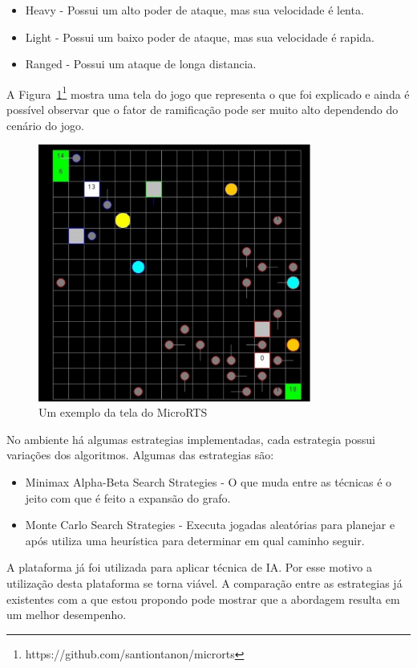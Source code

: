 \begin{itemize}
	\item Heavy - Possui um alto poder de ataque, mas sua velocidade é lenta.
	\item Light - Possui um baixo poder de ataque, mas sua velocidade é rapida.
	\item Ranged - Possui um ataque de longa distancia. 
\end{itemize} 

A Figura~\ref{fig:microrts}\footnote{https://github.com/santiontanon/microrts} mostra uma tela do jogo que representa o que foi explicado e ainda é possível observar que o fator de ramificação pode ser muito alto dependendo do cenário do jogo. %

\begin{figure}[ht]
	\centering
	\includegraphics[width=0.8\textwidth]{fig/microrts.pdf}
	\caption{Um exemplo da tela do MicroRTS}
	\label{fig:microrts}
\end{figure} 

No ambiente há algumas estrategias implementadas, cada estrategia possui variações dos algoritmos. Algumas das estrategias são:
\begin{itemize}
	\item Minimax Alpha-Beta Search Strategies - O que muda entre as técnicas é o jeito com que é feito a expansão do grafo.
	\item Monte Carlo Search Strategies - Executa jogadas aleatórias para planejar e após utiliza uma heurística para determinar em qual caminho seguir.
\end{itemize}

A plataforma já foi utilizada para aplicar técnica de IA. Por esse motivo a utilização desta plataforma se torna viável. A comparação entre as estrategias já existentes com a que estou propondo pode mostrar que a abordagem resulta em um melhor desempenho. 
